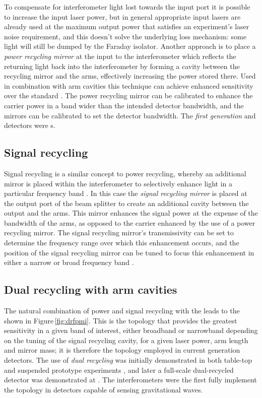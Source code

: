 To compensate for interferometer light lost towards the input port it is possible to increase the input laser power, but in general appropriate input lasers are already used at the maximum output power that satisfies an experiment's laser noise requirement, and this doesn't solve the underlying loss mechanism: some light will still be dumped by the Faraday isolator. Another approach is to place a \emph{power recycling mirror} at the input to the interferometer which reflects the returning light back into the interferometer by forming a cavity between the recycling mirror and the arms, effectively increasing the power stored there. Used in combination with \FP{} arm cavities this technique can achieve enhanced sensitivity over the standard \MI{}. The power recycling mirror can be calibrated to enhance the carrier power in a band wider than the intended detector bandwidth, and the \FP{} mirrors can be calibrated to set the detector bandwidth. The \emph{first generation} \ILIGO{} and \IVIRGO{} detectors were \PRFPMI{}s.

\subsection{\label{sec:signal-recycling}Signal recycling}
Signal recycling is a similar concept to power recycling, whereby an additional mirror is placed within the interferometer to selectively enhance light in a particular frequency band \cite{Meers1988}. In this case the \emph{signal recycling mirror} is placed at the output port of the beam splitter to create an additional cavity between the output and the arms. This mirror enhances the signal power at the expense of the bandwidth of the arms, as opposed to the carrier enhanced by the use of a power recycling mirror. The signal recycling mirror's transmissivity can be set to determine the frequency range over which this enhancement occurs, and the position of the signal recycling mirror can be tuned to focus this enhancement in either a narrow or broad frequency band \cite{Buonanno2001}.

\subsection{Dual recycling with \FP{} arm cavities}
The natural combination of power and signal recycling with the \FPMI{} leads to the \emph{\DRFPMI{}} shown in Figure\,\ref{fig:drfpmi}. This is the topology that provides the greatest sensitivity in a given band of interest, either broadband or narrowband depending on the tuning of the signal recycling cavity, for a given laser power, arm length and mirror mass; it is therefore the topology employed in current generation detectors. The use of \emph{dual recycling} was initially demonstrated in both table-top and suspended prototype experiments \cite{Strain1991, Heinzel1998, Freise2000}, and later a full-scale dual-recycled \MI{} detector was demonstrated at \GEO{} \cite{Heinzel2002, Grote2004}. The \ALIGO{} interferometers were the first fully implement the \DRFPMI{} topology in detectors capable of sensing gravitational waves.


